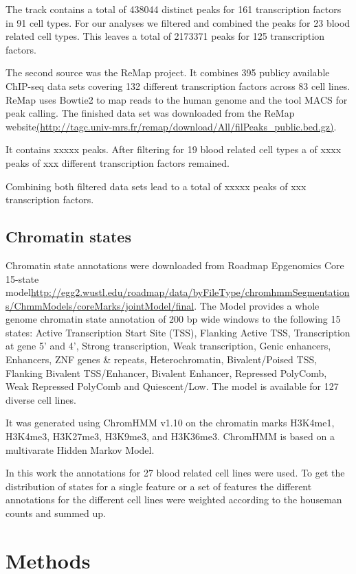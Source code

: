 \documentclass[a4paper,12pt]{article}
\begin{document}
The track contains a total of 438044 distinct peaks for 161 transcription factors in 91 cell types. For our analyses we filtered and combined the peaks for 23 blood related cell types. This leaves a total of 2173371 peaks for 125 transcription factors.  

The second source was the ReMap project\cite{10.1093/nar/gku1280}. It combines 395 publicy available ChIP-seq data sets covering 132 different transcription factors across 83 cell lines. ReMap uses Bowtie2\cite{} to map reads to the human genome and the tool MACS\cite{} for peak calling. The finished data set was downloaded from the ReMap website\url{(http://tagc.univ-mrs.fr/remap/download/All/filPeaks_public.bed.gz)}.

It contains xxxxx peaks. After filtering for 19 blood related cell types a of xxxx peaks of xxx different transcription factors remained. 

Combining both filtered data sets lead to a total of xxxxx peaks of xxx transcription factors.


\subsection{Chromatin states}
Chromatin state annotations were downloaded from Roadmap Epgenomics Core 15-state model\url{http://egg2.wustl.edu/roadmap/data/byFileType/chromhmmSegmentations/ChmmModels/coreMarks/jointModel/final}. The Model provides a whole genome chromatin state annotation of 200 bp wide windows to the following 15 states: Active Transcription Start Site (TSS), Flanking Active TSS, Transcription at gene 5' and 4', Strong transcription, Weak transcription, Genic enhancers, Enhancers, ZNF genes \& repeats, Heterochromatin, Bivalent/Poised TSS, Flanking Bivalent TSS/Enhancer, Bivalent Enhancer, Repressed PolyComb, Weak Repressed PolyComb and Quiescent/Low. The model is available for 127 diverse cell lines. 

It was generated using ChromHMM v1.10\cite{10.1038/nmeth.1906} on the chromatin marks H3K4me1, H3K4me3, H3K27me3, H3K9me3, and H3K36me3. ChromHMM is based on a multivarate Hidden Markov Model. 

In this work the annotations for 27 blood related cell lines were used. To get the distribution of states for a single feature or a set of features the different annotations for the different cell lines were weighted according to the houseman counts and summed up.

\section{Methods}
\end{document}
